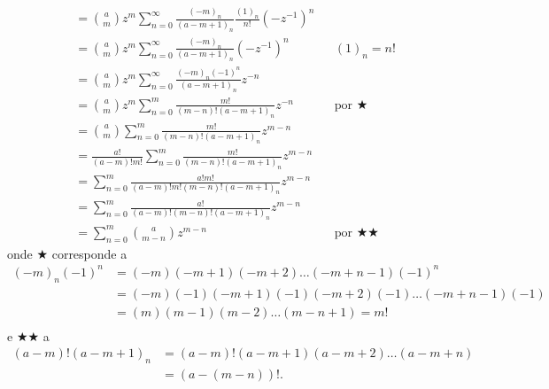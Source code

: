 \documentclass[a4paper,12pt, leqno, answers]{exam}
\begin{document}
\begin{questions}
\begin{parts}
\begin{solution}
\begin{align*}
                &= \binom{a}{m} z^m \sum_{n = 0}^\infty \frac{(-m)_n}{(a - m + 1)_n} \frac{(1)_n}{n!} (-z^{-1})^n \\
                &= \binom{a}{m} z^m \sum_{n = 0}^\infty \frac{(-m)_n}{(a - m + 1)_n} (-z^{-1})^n && (1)_n = n! \\
                &= \binom{a}{m} z^m \sum_{n = 0}^\infty \frac{(-m)_n (-1)^{n}}{(a - m + 1)_n} z^{-n} \\
                &= \binom{a}{m} z^m \sum_{n = 0}^m \frac{m!}{(m - n)! (a - m + 1)_n} z^{-n} && \text{por $\bigstar$} \\
                &= \binom{a}{m} \sum_{n = 0}^m \frac{m!}{(m - n)! (a - m + 1)_n} z^{m - n} \\
                &= \frac{a!}{(a - m)! m!} \sum_{n = 0}^m \frac{m!}{(m - n)! (a - m + 1)_n} z^{m - n} \\
                &= \sum_{n = 0}^m \frac{a! m!}{(a - m)! m! (m - n)! (a - m + 1)_n} z^{m - n} \\
                &= \sum_{n = 0}^m \frac{a!}{(a - m)! (m - n)! (a - m + 1)_n} z^{m - n} \\
                &= \sum_{n = 0}^m \binom{a}{m - n} z^{m - n} && \text{por $\bigstar\bigstar$}
            \end{align*}
            onde $\bigstar$ corresponde a
            \begin{align*}
                (-m)_n (-1)^n &= (-m) (-m + 1) (-m + 2) \ldots (-m + n - 1) (-1)^n \\
                &= (-m) (-1) (-m + 1) (-1) (-m + 2) (-1) \ldots (-m + n - 1) (-1) \\
                &= (m) (m - 1) (m - 2) \ldots (m - n + 1) = m! \\
            \end{align*}
            e $\bigstar\bigstar$ a
            \begin{align*}
                (a - m)! (a - m + 1)_n &= (a - m)! (a - m + 1) (a - m + 2) \ldots (a - m + n) \\
                &= (a - (m - n))!.
            \end{align*}
        \end{solution}


\end{parts}
\end{questions}
\end{document}
